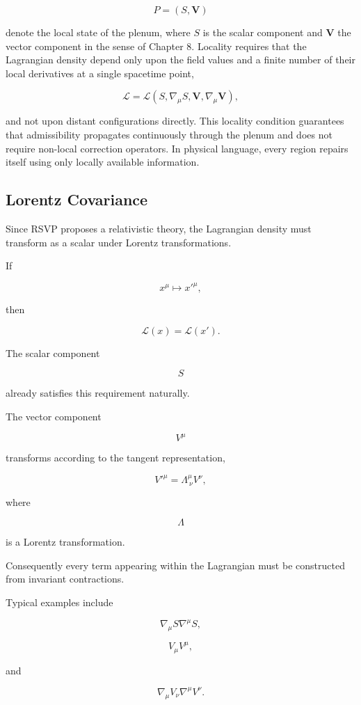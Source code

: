 \documentclass[11pt,oneside]{book}
\numberwithin{equation}{chapter}
\theoremstyle{definition}
\theoremstyle{plain}
\begin{document}
\[
P=(S,\mathbf V)
\]

denote the local state of the plenum, where \(S\) is the scalar component
and \(\mathbf V\) the vector component in the sense of Chapter 8. Locality
requires that the Lagrangian density depend only upon the field values and a
finite number of their local derivatives at a single spacetime point,

\[
\mathcal L
=
\mathcal L
\!\left(
S,
\nabla_\mu S,
\mathbf V,
\nabla_\mu\mathbf V
\right),
\]

and not upon distant configurations directly. This locality condition guarantees that admissibility propagates continuously through the plenum and does not require non-local correction operators. In physical language, every region repairs itself using only locally available information.

\subsection*{Lorentz Covariance}

Since RSVP proposes a relativistic theory, the Lagrangian density must
transform as a scalar under Lorentz transformations.

If

\[
x^\mu
\mapsto
{x'}^\mu,
\]

then

\[
\mathcal L(x)
=
\mathcal L(x').
\]

The scalar component

\[
S
\]

already satisfies this requirement naturally.

The vector component

\[
V^\mu
\]

transforms according to the tangent representation,

\[
{V'}^\mu
=
\Lambda^\mu_{\ \nu}
V^\nu,
\]

where

\[
\Lambda
\]

is a Lorentz transformation.

Consequently every term appearing within the Lagrangian must be constructed
from invariant contractions.

Typical examples include

\[
\nabla_\mu S
\nabla^\mu S,
\]

\[
V_\mu V^\mu,
\]

and

\[
\nabla_\mu V_\nu
\nabla^\mu V^\nu.
\]
\end{document}
